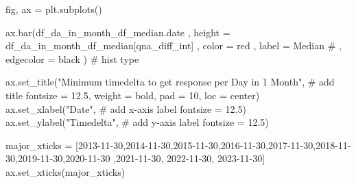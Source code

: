 \documentclass[
  letterpaper,
  DIV=11,
  numbers=noendperiod]{scrartcl}
\newenvironment{Shaded}{\begin{snugshade}}{\end{snugshade}}
\newcommand{\CommentTok}[1]{\textcolor[rgb]{0.37,0.37,0.37}{#1}}
\newcommand{\DecValTok}[1]{\textcolor[rgb]{0.68,0.00,0.00}{#1}}
\newcommand{\FloatTok}[1]{\textcolor[rgb]{0.68,0.00,0.00}{#1}}
\newcommand{\NormalTok}[1]{\textcolor[rgb]{0.00,0.23,0.31}{#1}}
\newcommand{\OperatorTok}[1]{\textcolor[rgb]{0.37,0.37,0.37}{#1}}
\newcommand{\StringTok}[1]{\textcolor[rgb]{0.13,0.47,0.30}{#1}}
\begin{document}
\begin{Shaded}
\begin{Highlighting}[]
\NormalTok{fig, ax }\OperatorTok{=}\NormalTok{ plt.subplots()}

\NormalTok{ax.bar(df\_da\_in\_month\_df\_median.date}
\NormalTok{    ,  height }\OperatorTok{=}\NormalTok{ df\_da\_in\_month\_df\_median[}\StringTok{\textquotesingle{}qna\_diff\_int\textquotesingle{}}\NormalTok{]}
\NormalTok{    ,  color }\OperatorTok{=} \StringTok{\textquotesingle{}red\textquotesingle{}}
\NormalTok{    ,  label }\OperatorTok{=} \StringTok{\textquotesingle{}Median\textquotesingle{}}
    \CommentTok{\# ,  edgecolor = \textquotesingle{}black\textquotesingle{}}
\NormalTok{      ) }\CommentTok{\# hist type}

\NormalTok{ax.set\_title(}\StringTok{"Minimum timedelta to get response per Day in 1 Month"}\NormalTok{, }\CommentTok{\# add title}
\NormalTok{             fontsize }\OperatorTok{=} \FloatTok{12.5}\NormalTok{,}
\NormalTok{             weight }\OperatorTok{=} \StringTok{\textquotesingle{}bold\textquotesingle{}}\NormalTok{,}
\NormalTok{             pad }\OperatorTok{=} \DecValTok{10}\NormalTok{,}
\NormalTok{             loc }\OperatorTok{=} \StringTok{\textquotesingle{}center\textquotesingle{}}\NormalTok{)}
\NormalTok{ax.set\_xlabel(}\StringTok{"Date"}\NormalTok{, }\CommentTok{\# add x{-}axis label}
\NormalTok{              fontsize }\OperatorTok{=} \FloatTok{12.5}\NormalTok{)}
\NormalTok{ax.set\_ylabel(}\StringTok{"Timedelta"}\NormalTok{, }\CommentTok{\# add y{-}axis label}
\NormalTok{              fontsize }\OperatorTok{=} \FloatTok{12.5}\NormalTok{)}

\NormalTok{major\_xticks }\OperatorTok{=}\NormalTok{ [}\StringTok{\textquotesingle{}2013{-}11{-}30\textquotesingle{}}\NormalTok{,}\StringTok{\textquotesingle{}2014{-}11{-}30\textquotesingle{}}\NormalTok{,}\StringTok{\textquotesingle{}2015{-}11{-}30\textquotesingle{}}\NormalTok{,}\StringTok{\textquotesingle{}2016{-}11{-}30\textquotesingle{}}\NormalTok{,}\StringTok{\textquotesingle{}2017{-}11{-}30\textquotesingle{}}\NormalTok{,}\StringTok{\textquotesingle{}2018{-}11{-}30\textquotesingle{}}\NormalTok{,}\StringTok{\textquotesingle{}2019{-}11{-}30\textquotesingle{}}\NormalTok{,}\StringTok{\textquotesingle{}2020{-}11{-}30\textquotesingle{}}
\NormalTok{                ,}\StringTok{\textquotesingle{}2021{-}11{-}30\textquotesingle{}}\NormalTok{, }\StringTok{\textquotesingle{}2022{-}11{-}30\textquotesingle{}}\NormalTok{, }\StringTok{\textquotesingle{}2023{-}11{-}30\textquotesingle{}}\NormalTok{]}
\NormalTok{ax.set\_xticks(major\_xticks)}


\end{Highlighting}
\end{Shaded}
\end{document}
